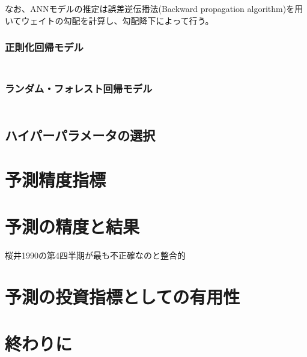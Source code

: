 \documentclass[a4paper, 12pt]{jsreport}
\begin{document}
なお、ANNモデルの推定は誤差逆伝播法(Backward propagation algorithm)を用いてウェイトの勾配を計算し、勾配降下によって行う。

\subsection{正則化回帰モデル}

\begin{equation}
  \begin{split}
  \end{split}
\end{equation}

\subsection{ランダム・フォレスト回帰モデル}

\begin{equation}
  \begin{split}
  \end{split}
\end{equation}

\section{ハイパーパラメータの選択}

\chapter{予測精度指標}

\chapter{予測の精度と結果}

桜井1990の第4四半期が最も不正確なのと整合的

\chapter{予測の投資指標としての有用性}

\chapter{終わりに}



\end{document}
